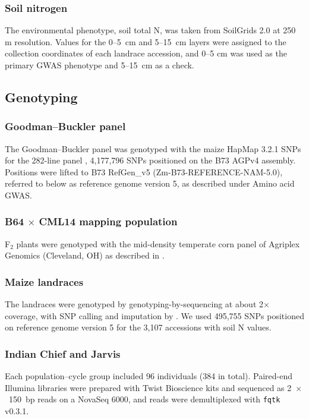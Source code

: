 \subsubsection{Soil nitrogen}
The environmental phenotype, soil total N, was taken from SoilGrids 2.0 \citep{Poggio2021SoilGrids} at 250 m resolution. Values for the 0--5~cm and 5--15~cm layers were assigned to the collection coordinates of each landrace accession, and 0--5 cm was used as the primary GWAS phenotype and 5--15~cm as a check.

\subsection{Genotyping}

\subsubsection{Goodman--Buckler panel}
The Goodman--Buckler panel was genotyped with the maize HapMap 3.2.1 SNPs for the 282-line panel \citep{Bukowski2018HapMap3}, 4,177,796 SNPs positioned on the B73 AGPv4 assembly. Positions were lifted to B73 RefGen\_v5 (Zm-B73-REFERENCE-NAM-5.0), referred to below as reference genome version 5, as described under Amino acid GWAS.

\subsubsection{B64 $\times$ CML14 mapping population}
F$_2$ plants were genotyped with the mid-density temperate corn panel of Agriplex Genomics (Cleveland, OH) as described in \citet{Fitzsimmons2026KernelKitchen}.

\subsubsection{Maize landraces}
The landraces were genotyped by genotyping-by-sequencing at about 2$\times$ coverage, with SNP calling and imputation by \citet{RomeroNavarro2017Landraces}. We used 495,755 SNPs positioned on reference genome version 5 for the 3,107 accessions with soil N values.

\subsubsection{Indian Chief and Jarvis}

Each population--cycle group included 96 individuals (384 in total). Paired-end Illumina libraries were prepared with Twist Bioscience kits and sequenced as 2~$\times$~150~bp reads on a NovaSeq 6000, and reads were demultiplexed with \texttt{fqtk} v0.3.1.

